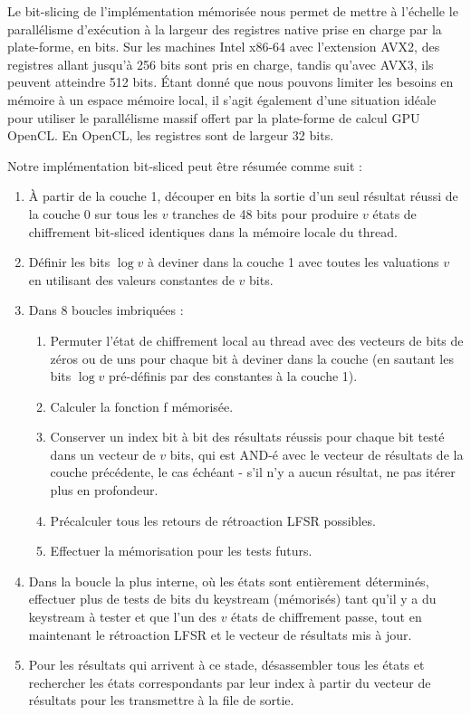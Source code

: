 \documentclass{template}
\begin{document}
Le bit-slicing de l'implémentation mémorisée nous permet de mettre à l'échelle le parallélisme d'exécution à la largeur des registres native prise en charge par la plate-forme, en bits. Sur les machines Intel x86-64 avec l'extension AVX2, des registres allant jusqu'à 256 bits sont pris en charge, tandis qu'avec AVX3, ils peuvent atteindre 512 bits. Étant donné que nous pouvons limiter les besoins en mémoire à un espace mémoire local, il s'agit également d'une situation idéale pour utiliser le parallélisme massif offert par la plate-forme de calcul GPU OpenCL. En OpenCL, les registres sont de largeur 32 bits.

Notre implémentation bit-sliced peut être résumée comme suit :

\begin{enumerate}
\item À partir de la couche 1, découper en bits la sortie d'un seul résultat réussi de la couche 0 sur tous les $v$ tranches de 48 bits pour produire $v$ états de chiffrement bit-sliced identiques dans la mémoire locale du thread.
\item Définir les bits $\log v$ à deviner dans la couche 1 avec toutes les valuations $v$ en utilisant des valeurs constantes de $v$ bits.
\item Dans 8 boucles imbriquées :
\begin{enumerate}
\item Permuter l'état de chiffrement local au thread avec des vecteurs de bits de zéros ou de uns pour chaque bit à deviner dans la couche (en sautant les bits $\log v$ pré-définis par des constantes à la couche 1).
\item Calculer la fonction f mémorisée.
\item Conserver un index bit à bit des résultats réussis pour chaque bit testé dans un vecteur de $v$ bits, qui est AND-é avec le vecteur de résultats de la couche précédente, le cas échéant - s'il n'y a aucun résultat, ne pas itérer plus en profondeur.
\item Précalculer tous les retours de rétroaction LFSR possibles.
\item Effectuer la mémorisation pour les tests futurs.
\end{enumerate}
\item Dans la boucle la plus interne, où les états sont entièrement déterminés, effectuer plus de tests de bits du keystream (mémorisés) tant qu'il y a du keystream à tester et que l'un des $v$ états de chiffrement passe, tout en maintenant le rétroaction LFSR et le vecteur de résultats mis à jour.
\item Pour les résultats qui arrivent à ce stade, désassembler tous les états et rechercher les états correspondants par leur index à partir du vecteur de résultats pour les transmettre à la file de sortie.
\end{enumerate}
\end{document}
